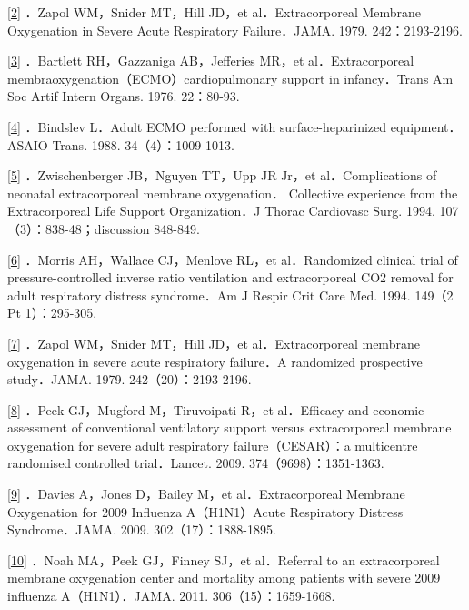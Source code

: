 \protect\hyperlink{text00030.htmlux5cux23ch2-29-back}{{[}2{]}} ．Zapol
WM，Snider MT，Hill JD，et al．Extracorporeal Membrane Oxygenation in
Severe Acute Respiratory Failure．JAMA. 1979. 242：2193-2196.

\protect\hyperlink{text00030.htmlux5cux23ch3-29-back}{{[}3{]}}
．Bartlett RH，Gazzaniga AB，Jefferies MR，et al．Extracorporeal
membraoxygenation（ECMO）cardiopulmonary support in infancy．Trans Am
Soc Artif Intern Organs. 1976. 22：80-93.

\protect\hyperlink{text00030.htmlux5cux23ch4-29-back}{{[}4{]}}
．Bindslev L．Adult ECMO performed with surface-heparinized
equipment．ASAIO Trans. 1988. 34（4）：1009-1013.

\protect\hyperlink{text00030.htmlux5cux23ch5-29-back}{{[}5{]}}
．Zwischenberger JB，Nguyen TT，Upp JR Jr，et al．Complications of
neonatal extracorporeal membrane oxygenation． Collective experience
from the Extracorporeal Life Support Organization．J Thorac Cardiovasc
Surg. 1994. 107（3）：838-48；discussion 848-849.

\protect\hyperlink{text00030.htmlux5cux23ch6-29-back}{{[}6{]}} ．Morris
AH，Wallace CJ，Menlove RL，et al．Randomized clinical trial of
pressure-controlled inverse ratio ventilation and extracorporeal CO2
removal for adult respiratory distress syndrome．Am J Respir Crit Care
Med. 1994. 149（2 Pt 1）：295-305.

\protect\hyperlink{text00030.htmlux5cux23ch7-29-back}{{[}7{]}} ．Zapol
WM，Snider MT，Hill JD，et al．Extracorporeal membrane oxygenation in
severe acute respiratory failure．A randomized prospective study．JAMA.
1979. 242（20）：2193-2196.

\protect\hyperlink{text00030.htmlux5cux23ch8-29-back}{{[}8{]}} ．Peek
GJ，Mugford M，Tiruvoipati R，et al．Efficacy and economic assessment of
conventional ventilatory support versus extracorporeal membrane
oxygenation for severe adult respiratory failure（CESAR）：a multicentre
randomised controlled trial．Lancet. 2009. 374（9698）：1351-1363.

\protect\hyperlink{text00030.htmlux5cux23ch9-29-back}{{[}9{]}} ．Davies
A，Jones D，Bailey M，et al．Extracorporeal Membrane Oxygenation for
2009 Influenza A（H1N1）Acute Respiratory Distress Syndrome．JAMA. 2009.
302（17）：1888-1895.

\protect\hyperlink{text00030.htmlux5cux23ch10-29-back}{{[}10{]}} ．Noah
MA，Peek GJ，Finney SJ，et al．Referral to an extracorporeal membrane
oxygenation center and mortality among patients with severe 2009
influenza A（H1N1）．JAMA. 2011. 306（15）：1659-1668.

